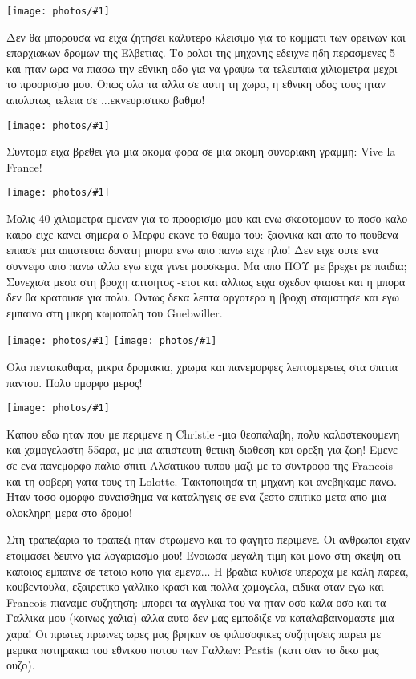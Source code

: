 \documentclass[]{book}
\newcommand\photo[1]{\noindent\texttt{[image: photos/\#1]}}
\begin{document}
\photo{74.jpg}

Δεν θα μπορουσα να ειχα ζητησει καλυτερο κλεισιμο για το κομματι των ορεινων και επαρχιακων δρομων της Ελβετιας.
Το ρολοι της μηχανης εδειχνε ηδη περασμενες 5 και ηταν ωρα να πιασω την εθνικη οδο για να γραψω τα τελευταια χιλιομετρα μεχρι το προορισμο μου. Οπως ολα τα αλλα σε αυτη τη χωρα, η εθνικη οδος τους ηταν απολυτως τελεια σε ...εκνευριστικο βαθμο!

\photo{75.jpg}

Συντομα ειχα βρεθει για μια ακομα φορα σε μια ακομη συνοριακη γραμμη: Vive la France!

\photo{76.jpg}

Μολις 40 χιλιομετρα εμεναν για το προορισμο μου και ενω σκεφτομουν το ποσο καλο καιρο ειχε κανει σημερα ο Μερφυ εκανε το θαυμα του: ξαφνικα και απο το πουθενα επιασε μια απιστευτα δυνατη μπορα ενω απο πανω ειχε ηλιο! Δεν ειχε ουτε ενα συννεφο απο πανω αλλα εγω ειχα γινει μουσκεμα. Μα απο ΠΟΥ με βρεχει ρε παιδια;
Συνεχισα μεσα στη βροχη απτοητος -ετσι και αλλιως ειχα σχεδον φτασει και η μπορα δεν θα κρατουσε για πολυ.
Οντως δεκα λεπτα αργοτερα η βροχη σταματησε και εγω εμπαινα στη μικρη κωμοπολη του Guebwiller.

\photo{77.jpg}
\photo{78.jpg}

Ολα πεντακαθαρα, μικρα δρομακια, χρωμα και πανεμορφες λεπτομερειες στα σπιτια παντου. 
Πολυ ομορφο μερος!

\photo{79.jpg}

Καπου εδω ηταν που με περιμενε η Christie -μια θεοπαλαβη, πολυ καλοστεκουμενη και χαμογελαστη 55αρα, με μια απιστευτη θετικη διαθεση και ορεξη για ζωη! Εμενε σε ενα πανεμορφο παλιο σπιτι Αλσατικου τυπου μαζι με το συντροφο της Francois και τη φοβερη γατα τους τη Lolotte.
Τακτοποιησα τη μηχανη και ανεβηκαμε πανω. Ηταν τοσο ομορφο συναισθημα να καταληγεις σε ενα ζεστο σπιτικο μετα απο μια ολοκληρη μερα στο δρομο!

Στη τραπεζαρια το τραπεζι ηταν στρωμενο και το φαγητο περιμενε. Οι ανθρωποι ειχαν ετοιμασει δειπνο για λογαριασμο μου! Ενοιωσα μεγαλη τιμη και μονο στη σκεψη οτι καποιος εμπαινε σε τετοιο κοπο για εμενα...
Η βραδια κυλισε υπεροχα με καλη παρεα, κουβεντουλα, εξαιρετικο γαλλικο κρασι και πολλα χαμογελα, ειδικα οταν εγω και Francois πιαναμε συζητηση: μπορει τα αγγλικα του να ηταν οσο καλα οσο και τα Γαλλικα μου (κοινως χαλια) αλλα αυτο δεν μας εμποδιζε να καταλαβαινομαστε μια χαρα! 
Οι πρωτες πρωινες ωρες μας βρηκαν σε φιλοσοφικες συζητησεις παρεα με μερικα ποτηρακια του εθνικου ποτου των Γαλλων: Pastis (κατι σαν το δικο μας ουζο).
\end{document}
